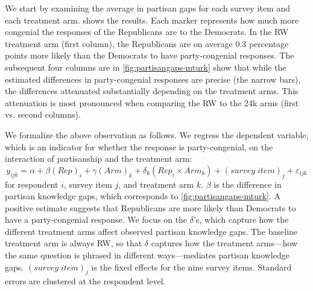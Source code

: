\documentclass[12pt, letterpaper]{article}
\begin{document}
We start by examining the average in partisan gaps for each survey item and each treatment arm.  shows the results. Each marker represents how much more congenial the responses of the Republicans are to the Democrats.
In the RW treatment arm (first column), the Republicans are on average 0.3 percentage points more likely than the Democrats to have party-congenial responses. The subsequent four columns are in \cref{fig:partisangaps-mturk} show that while the estimated differences in party-congenial responses are precise (the narrow bars), the differences attenuated substantially depending on the treatment arms. This attenuation is most pronounced when comparing the RW to the 24k arms (first vs. second columns).

We formalize the above observation as follows. We regress the dependent variable, which is an indicator for whether the response is party-congenial, on the interaction of partisanship and the treatment arm:
\begin{equation}\label{eq:partisangap-mturk}
	y_{ijk} = \alpha + \beta (Rep)_i + \gamma (Arm)_k + \delta_k (Rep_i \times Arm_k) + (survey \; item)_j + \varepsilon_{ijk}
\end{equation}
for respondent $i$, survey item $j$, and treatment arm $k$. $\beta$ is the difference in partisan knowledge gaps, which corresponds to \cref{fig:partisangaps-mturk}. A positive estimate suggests that Republicans are more likely than Democrats to have a party-congenial response.
We focus on the $\delta$'s, which capture how the different treatment arms affect observed partisan knowledge gaps. The baseline treatment arm is always RW, so that $\delta$ captures how the treatment arms---how the same question is phrased in different ways---mediates partisan knowledge gaps.
$(survey \; item)_j$ is the fixed effects for the nine survey items.
Standard errors are clustered at the respondent level.
\end{document}
